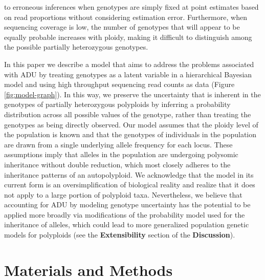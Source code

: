 \documentclass[11pt,english,letterpaper,oneside]{article}
\begin{document}
to erroneous inferences when genotypes are simply fixed at point estimates based on read proportions without considering estimation error. Furthermore, when sequencing coverage is low, the number of genotypes that will appear to be equally probable increases with ploidy, making it difficult to distinguish among the possible partially heterozygous genotypes.
\medskip

In this paper we describe a model that aims to address the problems associated with ADU by treating genotypes as a latent variable in a hierarchical Bayesian model and using high throughput sequencing read counts as data (Figure \ref{fig:model-graph}). In this way, we preserve the uncertainty that is inherent in the genotypes of partially heterozygous polyploids by inferring a probability distribution across all possible values of the genotype, rather than treating the genotypes as being directly observed. Our model assumes that the ploidy level of the population is known and that the genotypes of individuals in the population are drawn from a single underlying allele frequency for each locus. These assumptions imply that alleles in the population are undergoing polysomic inheritance without double reduction, which most closely adheres to the inheritance patterns of an autopolyploid. We acknowledge that the model in its current form is an oversimplification of biological reality and realize that it does not apply to a large portion of polyploid taxa. Nevertheless, we believe that accounting for ADU by modeling genotype uncertainty has the potential to be applied more broadly via modifications of the probability model used for the inheritance of alleles, which could lead to more generalized population genetic models for polyploids (see the \textbf{Extensibility} section of the \textbf{Discussion}).
\medskip

\section*{Materials and Methods}        %
\end{document}
